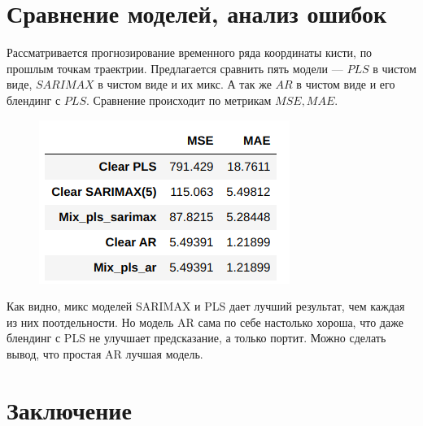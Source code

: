 \documentclass{article}
\begin{document}
\section{Сравнение моделей, анализ ошибок}
Рассматривается прогнозирование временного ряда координаты кисти, по прошлым точкам траектрии. Предлагается сравнить пять модели --- $PLS$ в чистом виде, $SARIMAX$ в чистом виде и их микс. А так же $AR$ в чистом виде и его блендинг с $PLS$. Сравнение происходит по метрикам $MSE, MAE$.
\begin{figure}[H]
\includegraphics[scale=1]{images/7.png}
\end{figure}
Как видно, микс моделей SARIMAX и PLS дает лучший результат, чем каждая из них поотдельности. Но модель AR сама по себе настолько хороша, что даже блендинг с PLS не улучшает предсказание, а только портит. Можно сделать вывод, что простая AR лучшая модель.
\section{Заключение}



\nocite{*}


\end{document}
